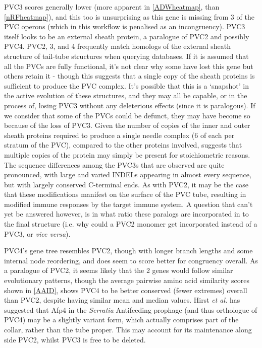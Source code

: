 PVC3 scores generally lower (more apparent in \vref{ADWheatmap}, than \vref{nRFheatmap}), and this too is unsurprising as this gene is missing from 3 of the PVC operons (which in this workflow is penalised as an incongruency). PVC3 itself looks to be an external sheath protein, a paralogue of PVC2 and possibly PVC4. PVC2, 3, and 4 frequently match homologs of the external sheath structure of tail-tube structures when querying databases. If it is assumed that all the PVCs are fully functional, it's not clear why some have lost this gene but others retain it - though this suggests that a single copy of the sheath proteins is sufficient to produce the PVC complex. It's possible that this is a `snapshot' in the active evolution of these structures, and they may all be capable, or in the process of, losing PVC3 without any deleterious effects (since it is paralogous). If we consider that some of the PVCs could be defunct, they may have become so because of the loss of PVC3. Given the number of copies of the inner and outer sheath proteins required to produce a single needle complex (6 of each per stratum of the PVC), compared to the other proteins involved, suggests that multiple copies of the protein may simply be present for stoichiometric reasons. The sequence differences among the PVC3s that are observed are quite pronounced, with large and varied INDELs appearing in almost every sequence, but with largely conserved C-terminal ends. As with PVC2, it may be the case that these modifications manifest on the surface of the PVC tube, resulting in modified immune responses by the target immune system. A question that can't yet be answered however, is in what ratio these paralogs are incorporated in to the final structure (i.e. why could a PVC2 monomer get incorporated instead of a PVC3, or \emph{vice versa}).

PVC4's gene tree resembles PVC2, though with longer branch lengths and some internal node reordering, and does seem to score better for congruency overall. As a paralogue of PVC2, it seems likely that the 2 genes would follow similar evolutionary patterns, though the average pairwise amino acid similarity scores shown in \vref{AAID}, shows PVC4 to be better conserved (fewer extremes) overall than PVC2, despite having similar mean and median values. Hirst \emph{et al.} has suggested that Afp4 in the \emph{Serratia} Antifeeding prophage (and thus orthologue of PVC4) may be a slightly variant form, which actually comprises part of the collar, rather than the tube proper. This may account for its maintenance along side PVC2, whilst PVC3 is free to be deleted.

